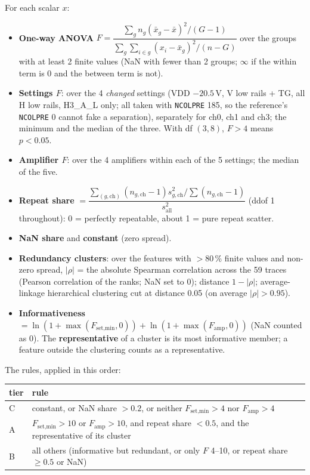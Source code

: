 \documentclass[10pt]{article}
\newcommand{\code}[1]{\texttt{#1}}
\begin{document}
\noindent For each scalar $x$:
\begin{itemize}
\item \textbf{One-way ANOVA} $F = \dfrac{\sum_g n_g(\bar x_g - \bar x)^2/(G-1)}{\sum_g\sum_{i\in g}(x_i - \bar x_g)^2/(n - G)}$ over the
  groups with at least 2 finite values (NaN with fewer than 2 groups; $\infty$ if the within term is 0 and the between term is not).
\item \textbf{Settings $F$}: over the 4 \emph{changed} settings (VDD $-20.5$\,V, V low rails + TG, all H low rails, H3\_A\_L only; all
  taken with \code{NCOLPRE} 185, so the reference's \code{NCOLPRE} 0 cannot fake a separation), separately for ch0, ch1 and ch3; the minimum
  and the median of the three. With df $(3, 8)$, $F > 4$ means $p < 0.05$.
\item \textbf{Amplifier $F$}: over the 4 amplifiers within each of the 5 settings; the median of the five.
\item \textbf{Repeat share} $=\dfrac{\sum_{(g,\text{ch})}(n_{g,\text{ch}} - 1)s^2_{g,\text{ch}}/\sum(n_{g,\text{ch}} - 1)}{s^2_\text{all}}$ (ddof 1
  throughout): 0 = perfectly repeatable, about 1 = pure repeat scatter.
\item \textbf{NaN share} and \textbf{constant} (zero spread).
\item \textbf{Redundancy clusters}: over the features with $> 80$\,\% finite values and non-zero spread, $|\rho|$ = the absolute Spearman
  correlation across the 59 traces (Pearson correlation of the ranks; NaN set to 0); distance $1 - |\rho|$; average-linkage hierarchical
  clustering cut at distance 0.05 (on average $|\rho| > 0.95$).
\item \textbf{Informativeness} $= \ln(1 + \max(F_\text{set,min}, 0)) + \ln(1 + \max(F_\text{amp}, 0))$ (NaN counted as 0). The
  \textbf{representative} of a cluster is its most informative member; a feature outside the clustering counts as a representative.
\end{itemize}
The rules, applied in this order:
\begin{center}
\small
\begin{tabular}{lp{}}
\toprule
tier & rule \\
\midrule
C & constant, or NaN share $> 0.2$, or neither $F_\text{set,min} > 4$ nor $F_\text{amp} > 4$ \\
A & $F_\text{set,min} > 10$ or $F_\text{amp} > 10$, and repeat share $< 0.5$, and the representative of its cluster \\
B & all others (informative but redundant, or only $F$ 4--10, or repeat share $\ge 0.5$ or NaN) \\
\bottomrule
\end{tabular}
\end{center}
\end{document}
